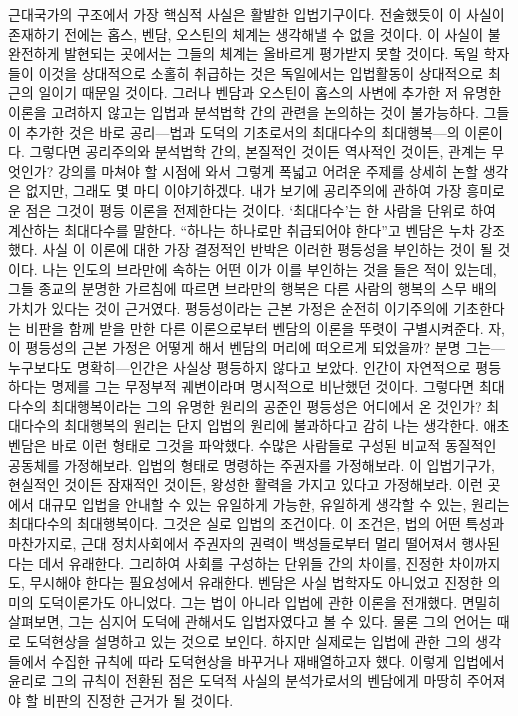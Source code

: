 근대국가의 구조에서 가장 핵심적 사실은 활발한 입법기구이다.
전술했듯이 이 사실이 존재하기 전에는
홉스, 벤담, 오스틴의 체계는 생각해낼 수 없을 것이다.
이 사실이 불완전하게 발현되는 곳에서는 그들의 체계는 올바르게
평가받지 못할 것이다.
독일 학자들이 이것을 상대적으로 소홀히 취급하는 것은
독일에서는 입법활동이 상대적으로 최근의 일이기 때문일 것이다.
그러나
벤담과 오스틴이 홉스의 사변에 추가한 저 유명한 이론을
고려하지 않고는 입법과 분석법학 간의 관련을 논의하는 것이 불가능하다.
그들이 추가한 것은 바로 공리---법과 도덕의 기초로서의
최대다수의 최대행복---의 이론이다.
그렇다면 공리주의와 분석법학 간의, 본질적인 것이든 역사적인 것이든,
관계는 무엇인가?
강의를 마쳐야 할 시점에 와서 그렇게 폭넓고 어려운 주제를
상세히 논할 생각은 없지만, 그래도 몇 마디 이야기하겠다.
내가 보기에 공리주의에 관하여 가장 흥미로운 점은
그것이 평등 이론을 전제한다는 것이다.
`최대다수'는 한 사람을 단위로 하여 계산하는 최대다수를 말한다.
``하나는 하나로만 취급되어야 한다''고 벤담은 누차 강조했다.
사실 이 이론에 대한 가장 결정적인 반박은 이러한 평등성을 부인하는 것이
될 것이다.
나는 인도의 브라만에 속하는 어떤 이가 이를 부인하는 것을 들은 적이 있는데,
그들 종교의 분명한 가르침에 따르면
브라만의 행복은 다른 사람의 행복의 스무 배의 가치가 있다는 것이 근거였다.
평등성이라는 근본 가정은 
순전히 이기주의에 기초한다는 비판을 함께 받을 만한 다른 이론으로부터
벤담의 이론을
뚜렷이 구별시켜준다.
자, 이 평등성의 근본 가정은 어떻게 해서 벤담의 머리에 떠오르게 되었을까?
분명 그는---누구보다도 명확히---인간은 사실상 평등하지 않다고 보았다.
인간이 자연적으로 평등하다는 명제를 그는
무정부적 궤변이라며 명시적으로 비난했던 것이다.
그렇다면
최대다수의 최대행복이라는 그의 유명한 원리의 공준인
평등성은 어디에서 온 것인가?
최대다수의 최대행복의 원리는 단지 입법의 원리에 불과하다고 감히 나는 생각한다.
애초 벤담은 바로 이런 형태로 그것을 파악했다.
수많은 사람들로 구성된 비교적 동질적인 공동체를 가정해보라.
입법의 형태로 명령하는 주권자를 가정해보라.
이 입법기구가, 현실적인 것이든 잠재적인 것이든,
왕성한 활력을 가지고 있다고 가정해보라.
이런 곳에서
대규모 입법을 안내할 수 있는 유일하게 가능한, 유일하게 생각할 수 있는,
원리는 최대다수의 최대행복이다.
그것은 실로 입법의 조건이다.
이 조건은,
법의 어떤 특성과 마찬가지로,
근대 정치사회에서 주권자의 권력이 백성들로부터 멀리 떨어져서 행사된다는 데서
유래한다.
그리하여 사회를 구성하는 단위들 간의 차이를, 진정한 차이까지도,
무시해야 한다는 필요성에서 유래한다.
벤담은 사실 법학자도 아니었고 진정한 의미의 도덕이론가도 아니었다.
그는 법이 아니라 입법에 관한 이론을 전개했다.
면밀히 살펴보면, 그는 심지어 도덕에 관해서도 입법자였다고 볼 수 있다.
물론 그의 언어는 때로 도덕현상을 설명하고 있는 것으로 보인다.
하지만 실제로는 입법에 관한 그의 생각들에서 수집한 규칙에 따라
도덕현상을 바꾸거나 재배열하고자 했다.
이렇게 입법에서 윤리로 그의 규칙이 전환된 점은
도덕적 사실의 분석가로서의 벤담에게 마땅히 주어져야 할
비판의 진정한 근거가 될 것이다.





